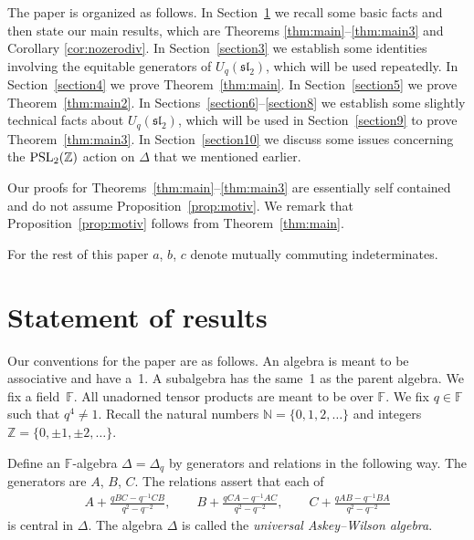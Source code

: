 \documentclass[pdftex]{sigma}
\numberwithin{equation}{section}
\begin{document}
The paper is organized as follows.
In Section~\ref{section2} we recall some
basic facts and then
state our main results, which are
Theorems \ref{thm:main}--\ref{thm:main3} and
Corollary
\ref{cor:nozerodiv}.
In Section~\ref{section3} we establish some identities
involving the equitable generators of
$U_q(\mathfrak{sl}_2)$,
which will be used
repeatedly.
In Section~\ref{section4} we prove Theorem~\ref{thm:main}.
In Section~\ref{section5} we prove Theorem~\ref{thm:main2}.
In Sections~\ref{section6}--\ref{section8}
we establish some slightly technical facts about
$U_q(\mathfrak{sl}_2)$,
which will be used in Section~\ref{section9}
to prove
Theorem~\ref{thm:main3}.
In Section~\ref{section10} we discuss some issues
concerning the
${\rm  {PSL}}_2(\mathbb Z)$ action on $\Delta$ that we mentioned earlier.

Our proofs for
Theorems~\ref{thm:main}--\ref{thm:main3}
are essentially self contained
and do not assume
Proposition~\ref{prop:motiv}.
We remark that
Proposition~\ref{prop:motiv} follows from Theorem~\ref{thm:main}.

For the rest of this paper $a$, $b$, $c$ denote mutually
commuting indeterminates.




\section{Statement of results}\label{section2}

Our conventions for the paper are as follows.
An algebra is meant to be associative and have a~1.
A subalgebra has the same~1 as the parent algebra.
We f\/ix a f\/ield~$\mathbb F$. All unadorned tensor products
are meant to be over $\mathbb F$. We f\/ix $q \in \mathbb F$ such that
$q^4\not=1$. Recall the natural numbers
$\mathbb N = \lbrace 0,1,2,\ldots \rbrace$ and
integers $\mathbb Z=\lbrace 0, \pm 1, \pm 2,\ldots \rbrace$.

\begin{Definition}
\label{def:uaw}
Def\/ine an $\mathbb F$-algebra
$\Delta=\Delta_q$
by generators and relations in the following way.
The generators are $A$, $B$, $C$.
The relations assert that each of
\begin{gather}
 A+ \frac{qBC-q^{-1}CB}{q^2-q^{-2}},
\qquad B+
\frac{qCA-q^{-1}AC}{q^2-q^{-2}},
\qquad
C+
\frac{qAB-q^{-1}BA}{q^2-q^{-2}}
\label{eq:comlist}
\end{gather}
is central in $\Delta$.
The algebra
$\Delta$ is called the {\it universal Askey--Wilson algebra}.
\end{Definition}
\end{document}
